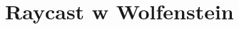 \documentclass{article}
\begin{document}
\tableofcontents
\newpage

\section{Raycast w Wolfenstein}
\end{document}
